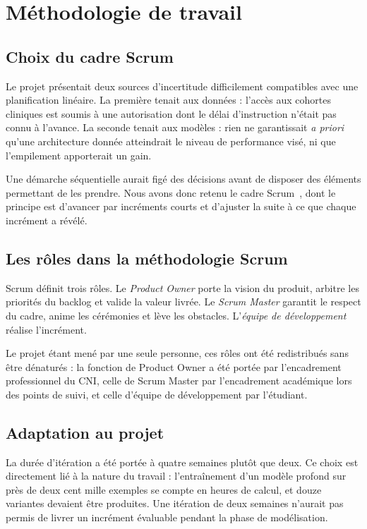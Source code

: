 \section{Méthodologie de travail}

\subsection{Choix du cadre Scrum}

Le projet présentait deux sources d'incertitude difficilement compatibles avec une
planification linéaire. La première tenait aux données : l'accès aux cohortes cliniques
est soumis à une autorisation dont le délai d'instruction n'était pas connu à l'avance.
La seconde tenait aux modèles : rien ne garantissait \emph{a priori} qu'une
architecture donnée atteindrait le niveau de performance visé, ni que l'empilement
apporterait un gain.

Une démarche séquentielle aurait figé des décisions avant de disposer des éléments
permettant de les prendre. Nous avons donc retenu le cadre Scrum~\cite{schwaber2020},
dont le principe est d'avancer par incréments courts et d'ajuster la suite à ce que
chaque incrément a révélé.

\subsection{Les rôles dans la méthodologie Scrum}

Scrum définit trois rôles. Le \emph{Product Owner} porte la vision du produit, arbitre
les priorités du backlog et valide la valeur livrée. Le \emph{Scrum Master} garantit le
respect du cadre, anime les cérémonies et lève les obstacles. L'\emph{équipe de
développement} réalise l'incrément.

Le projet étant mené par une seule personne, ces rôles ont été redistribués sans être
dénaturés : la fonction de Product Owner a été portée par l'encadrement professionnel du
CNI, celle de Scrum Master par l'encadrement académique lors des points de suivi, et
celle d'équipe de développement par l'étudiant.

\subsection{Adaptation au projet}

La durée d'itération a été portée à quatre semaines plutôt que deux. Ce choix est
directement lié à la nature du travail : l'entraînement d'un modèle profond sur près de
deux cent mille exemples se compte en heures de calcul, et douze variantes devaient être
produites. Une itération de deux semaines n'aurait pas permis de livrer un incrément
évaluable pendant la phase de modélisation.


